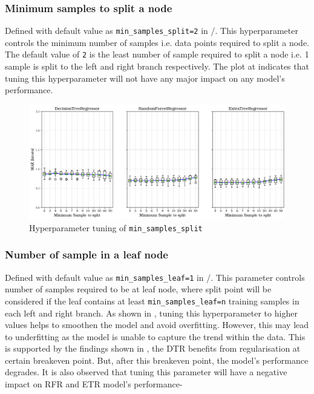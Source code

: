 \subsubsection*{Minimum samples to split a node}\label{sec:min_samples_split}

Defined with default value as {\tt min\_samples\_split=2} in \scikit/. This hyperparameter controls the minimum number of samples i.e. data points required to split a node. The default value of {\tt 2} is the least number of sample required to split a node i.e. 1 sample is split to the left and right branch respectively. The plot at  indicates that tuning this hyperparameter will not have any major impact on any model's performance.\\
\begin{figure}[h]
    \centering
        \includegraphics[width=.9\textwidth]{02_figures/hpo_min_samples_split_mae.png}
        \caption{Hyperparameter tuning of {\tt min\_samples\_split}}
        \label{fig:hpo_min_samples_split}
\end{figure}

\pagebreak

\subsubsection*{Number of sample in a leaf node}\label{sec:min_samples_leaf}

Defined with default value as {\tt min\_samples\_leaf=1} in \scikit/. This parameter controls number of samples required to be at leaf node, where split point will be considered if the leaf contains at least {\tt min\_samples\_leaf=n} training samples in each left and right branch. As shown in , tuning this hyperparameter to higher values helps to smoothen the model and avoid overfitting. However, this may lead to underfitting as the model is unable to capture the trend within the data. This is supported by the findings shown in , the DTR benefits from regularisation at certain breakeven point. But, after this breakeven point, the model's performance degrades. It is also observed that tuning this parameter will have a negative impact on RFR and ETR model's performance-  


